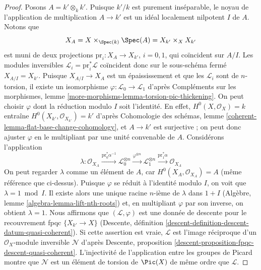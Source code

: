 \begin{proof}
\medskip\noindent
Posons $A = k' \otimes_k k'$. Puisque $k'/k$ est purement inséparable,
le noyau de l'application de multiplication $A \to k'$ est un
idéal localement nilpotent $I$ de $A$. Notons que
$$
X_A = X \times_{\Spec(k)} \Spec(A) = X_{k'} \times_X X_{k'}
$$
est muni de deux projections $\text{pr}_i : X_A \to X_{k'}$, $i = 0, 1$,
qui coïncident sur $A/I$. Les modules inversibles
$\mathcal{L}_i = \text{pr}_i^*\mathcal{L}$
coïncident donc sur le sous-schéma fermé $X_{A/I} = X_{k'}$.
Puisque $X_{A/I} \to X_A$ est un épaississement et que
les $\mathcal{L}_i$ sont de $n$-torsion, il
existe un isomorphisme $\varphi : \mathcal{L}_0 \to \mathcal{L}_1$ d'après
Compléments sur les morphismes, lemme \ref{more-morphisms-lemma-torsion-pic-thickening}.
On peut choisir $\varphi$ dont la réduction modulo $I$ soit l'identité. En effet,
$H^0(X, \mathcal{O}_X) = k$ entraîne
$H^0(X_{k'}, \mathcal{O}_{X_{k'}}) = k'$ d'après
Cohomologie des schémas, lemme \ref{coherent-lemma-flat-base-change-cohomology},
et $A \to k'$ est surjective ; on peut donc ajuster $\varphi$ en le multipliant par
une unité convenable de $A$. Considérons l'application
$$
\lambda : \mathcal{O}_{X_A}
\xrightarrow{\text{pr}_0^*\alpha^{-1}}
\mathcal{L}_0^{\otimes n}
\xrightarrow{\varphi^{\otimes n}}
\mathcal{L}_1^{\otimes n}
\xrightarrow{\text{pr}_1^*\alpha}
\mathcal{O}_{X_A}
$$
On peut regarder $\lambda$ comme un élément de $A$, car
$H^0(X_A, \mathcal{O}_{X_A}) = A$ (même référence que ci-dessus).
Puisque $\varphi$ se réduit à l'identité modulo $I$, on
voit que $\lambda = 1 \bmod I$. Il existe alors une unique
racine $n$-ième de $\lambda$ dans $1 + I$
(Algèbre, lemme \ref{algebra-lemma-lift-nth-roots})
et, en multipliant $\varphi$ par son inverse, on obtient $\lambda = 1$.
Nous affirmons que $(\mathcal{L}, \varphi)$ est une donnée de descente
pour le recouvrement fpqc $\{X_{k'} \to X\}$
(Descente, définition \ref{descent-definition-descent-datum-quasi-coherent}).
Si cette assertion est vraie, $\mathcal{L}$ est l'image réciproque d'un
$\mathcal{O}_X$-module inversible $\mathcal{N}$ d'après
Descente, proposition \ref{descent-proposition-fpqc-descent-quasi-coherent}.
L'injectivité de l'application entre les groupes de Picard montre que $\mathcal{N}$
est un élément de torsion de $\Pic(X)$ de même ordre que $\mathcal{L}$.


\end{proof}
